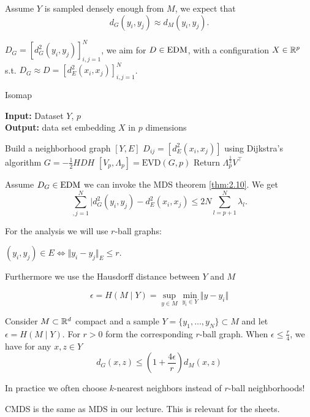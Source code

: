 Assume $Y$ is sampled densely enough from $M$, we expect that \[d_G(y_i,y_j)\approx d_M(y_i,y_j).\]

$D_G=[d_G^2(y_i,y_j)]_{i,j=1}^N$, we aim for $D\in\text{EDM}$, with a configuration $X\in\mathbb{R}^p$ s.t. 
$D_G\approx D=[d_E^2(x_i,x_j)]_{i,j=1}^N$.

\begin{algorithm}[H]
    \caption{Isomap}\label{alg:isomap}
 \textbf{Input:} Dataset  $Y$, $p$\\
 \textbf{Output:} data set embedding $X$ in $p$ dimensions
 \begin{algorithmic}
    \State Build a neighborhood graph $[Y,E]$
    \State $D_{ij}=[d_E^2(x_i,x_j)]$ using Dijkstra's algorithm 
    \State $G=-\frac{1}{2} H D H$
    \State $[V_p,\Lambda_p]=\text{EVD}(G,p)$
    \State Return $\Lambda_p^{\frac{1}{2}} V^\intercal$
 \end{algorithmic}
\end{algorithm}

Assume $D_G\in\text{EDM}$ we can invoke the MDS theorem \ref{thm:2.10}. We get 
\[\sum_{,j=1}^N \vert d_G^2(y_i,y_j)-d_E^2(x_i,x_j)\leq 2 N \sum_{l=p+1}^N \lambda_l.\] 

For the analysis we will use $r$-ball graphs: 

$(y_i,y_j)\in E\iff \Vert y_i-y_j\Vert_E\leq r$.

Furthermore we use the Hausdorff distance between $Y$ and $M$

\[\epsilon=H(M\mid Y)=\sup_{y\in M}\min_{y_i\in Y}\Vert y-y_i\Vert\]

\begin{theorem}\label{thm:2.12}
    Consider $M\subset\mathbb{R}^d$ compact and a sample $Y=\{y_1,\dots,y_N\}\subset M$ and let 
    $\epsilon=H(M\mid Y)$. For $r>0$ form the corresponding $r$-ball graph. When $\epsilon\leq \frac{r}{4}$, we 
    have for any $x,z\in Y$
    \[d_G(x,z)\leq \left(1+\frac{4\epsilon}{r}\right)d_M(x,z)\] 
\end{theorem}



In practice we often choose $k$-nearest neighbors instead of $r$-ball neighborhoods!

\begin{aremark}
    CMDS is the same as MDS in our lecture. This is relevant for the sheets.
\end{aremark}

